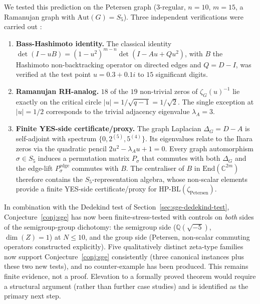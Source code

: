 \documentclass[11pt]{article}
\theoremstyle{definition}
\theoremstyle{remark}
\newcommand{\HBL}{\mathrm{HP\text{-}BL}}
\begin{document}
We tested this prediction on the Petersen graph (3-regular,
$n = 10$, $m = 15$, a Ramanujan graph with $\mathrm{Aut}(G) = S_5$).
Three independent verifications were carried out \cite{IharaPetersenTest}:
\begin{enumerate}
\item[(V1)] \textbf{Bass-Hashimoto identity.} The classical identity
  $\det(I - uB) = (1 - u^2)^{m-n}\det(I - Au + Qu^2)$, with $B$ the
  Hashimoto non-backtracking operator on directed edges and
  $Q = D - I$, was verified at the test point $u = 0.3 + 0.1 i$ to
  $15$ significant digits.
\item[(V2)] \textbf{Ramanujan RH-analog.} $18$ of the $19$
  non-trivial zeros of $\zeta_G(u)^{-1}$ lie exactly on the critical
  circle $|u| = 1/\sqrt{q-1} = 1/\sqrt{2}$. The single exception at
  $|u| = 1/2$ corresponds to the trivial adjacency eigenvalue
  $\lambda_A = 3$.
\item[(V3)] \textbf{Finite YES-side certificate/proxy.} The graph Laplacian
  $\Delta_G = D - A$ is self-adjoint with spectrum
  $\{0, 2^{(5)}, 5^{(4)}\}$. Its eigenvalues relate to the Ihara
  zeros via the quadratic pencil $2u^2 - \lambda_A u + 1 = 0$. Every
  graph automorphism $\sigma \in S_5$ induces a permutation matrix
  $P_\sigma$ that commutes with both $\Delta_G$ and the edge-lift
  $P_\sigma^{\mathrm{edge}}$ commutes with $B$. The centraliser of
  $B$ in $\mathrm{End}(\mathbb{C}^{2m})$ therefore contains the
  $S_5$-representation algebra, whose non-scalar elements provide a
  finite YES-side certificate/proxy for
  $\HBL(\zeta_{\mathrm{Petersen}})$.
\end{enumerate}

In combination with the Dedekind test of
Section~\ref{sec:sge-dedekind-test}, Conjecture~\ref{conj:sge} has
now been finite-stress-tested with controls on \emph{both} sides of
the semigroup-group dichotomy: the semigroup side
($\mathbb{Q}(\sqrt{-5})$, $\dim(Z) = 1$) at $N \leq 10$, and the
group side (Petersen, non-scalar commuting operators constructed
explicitly). Five qualitatively distinct zeta-type families now
support Conjecture~\ref{conj:sge} consistently (three canonical
instances plus these two new tests), and no counter-example has been
produced. This remains finite evidence, not a proof. Elevation to a
formally proved theorem would require a structural argument (rather
than further case studies) and is identified as the primary next
step.
\end{document}

